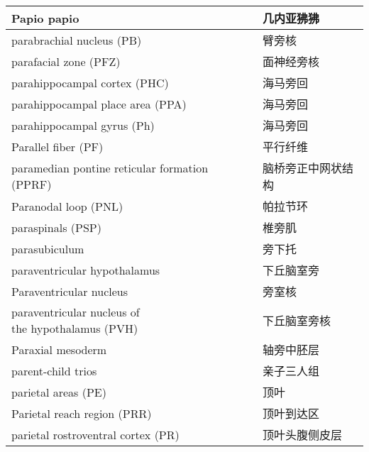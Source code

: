 \begin{longtable}{lll}
	\midrule
	Papio papio  && 几内亚狒狒   \\
	
	\midrule
	parabrachial nucleus (PB) && 臂旁核   \\
	
	\midrule
	parafacial zone (PFZ) && 面神经旁核   \\
	
	\midrule
	parahippocampal cortex (PHC)  && 海马旁回   \\
	
	\midrule
	parahippocampal place area (PPA)  && 海马旁回   \\
	
	\midrule
	parahippocampal gyrus  (Ph)   && 海马旁回   \\
	
	\midrule
	Parallel fiber (PF)    && 平行纤维   \\
	
	\midrule
	paramedian pontine reticular formation (PPRF)  && 脑桥旁正中网状结构   \\
	
	\midrule
	Paranodal loop (PNL)    && 帕拉节环   \\
	
	\midrule
	paraspinals (PSP)     && 椎旁肌   \\
	
	\midrule
	parasubiculum     && 旁下托   \\
	
	\midrule
	paraventricular hypothalamus     && 下丘脑室旁   \\
	
	\midrule
	Paraventricular nucleus     && 旁室核   \\
	
	\midrule
	\makecell[l]{paraventricular nucleus of\\ the hypothalamus (PVH)}    && 下丘脑室旁核   \\
	
	\midrule
	Paraxial mesoderm     && 轴旁中胚层   \\
	
	\midrule
	parent-child trios     && 亲子三人组   \\
	
	\midrule
	parietal areas (PE)    && 顶叶   \\
	
	\midrule
	Parietal reach region (PRR)     && 顶叶到达区   \\
	
	\midrule
	parietal rostroventral cortex (PR)     && 顶叶头腹侧皮层   \\
	

\end{longtable}

